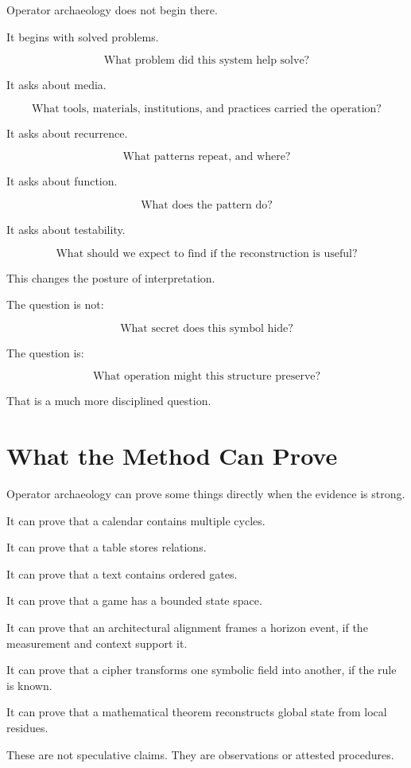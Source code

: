 \documentclass[11pt]{book}
\begin{document}
Operator archaeology does not begin there.

It begins with solved problems.

\[
\text{What problem did this system help solve?}
\]

It asks about media.

\[
\text{What tools, materials, institutions, and practices carried the operation?}
\]

It asks about recurrence.

\[
\text{What patterns repeat, and where?}
\]

It asks about function.

\[
\text{What does the pattern do?}
\]

It asks about testability.

\[
\text{What should we expect to find if the reconstruction is useful?}
\]

This changes the posture of interpretation.

The question is not:

\[
\text{What secret does this symbol hide?}
\]

The question is:

\[
\text{What operation might this structure preserve?}
\]

That is a much more disciplined question.

\section{What the Method Can Prove}

Operator archaeology can prove some things directly when the evidence is strong.

It can prove that a calendar contains multiple cycles.

It can prove that a table stores relations.

It can prove that a text contains ordered gates.

It can prove that a game has a bounded state space.

It can prove that an architectural alignment frames a horizon event, if the measurement and context support it.

It can prove that a cipher transforms one symbolic field into another, if the rule is known.

It can prove that a mathematical theorem reconstructs global state from local residues.

These are not speculative claims. They are observations or attested procedures.
\end{document}
